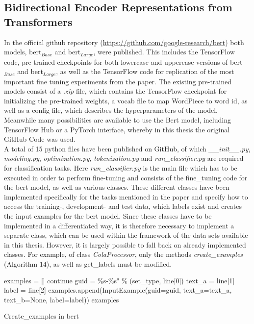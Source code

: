 \documentclass[a4paper, 11pt,titlepage,oneside,openany]{book}
\begin{document}
\subsection{Bidirectional Encoder Representations from Transformers}
In the official github repository (\url{https://github.com/google-research/bert}) both models, \gls{bert}$_{Base}$ and \gls{bert}$_{Large}$, were published. This includes the TensorFlow \cite{tensorflow} code, pre-trained checkpoints for both lowercase and uppercase versions of \gls{bert}$_{Base}$ and \gls{bert}$_{Large}$, as well as the TensorFlow code for replication of the most important fine tuning experiments from the paper. The existing pre-trained models consist of a \textit{.zip} file, which contains the TensorFlow checkpoint for initializing the pre-trained weights, a vocab file to map WordPiece to word id, as well as a config file, which describes the hyperparameters of the model. Meanwhile many possibilities are available to use the Bert model, including TensorFlow Hub or a PyTorch \cite{pytorch} interface, whereby in this thesis the original GitHub Code was used. \\ 
\noindent A total of 15 python files have been published on GitHub, of which \textit{\_\_init\_\_.py}, \textit{modeling.py}, \textit{optimization.py}, \textit{tokenization.py} and \textit{run\_classifier.py} are required for classification tasks. Here \textit{run\_classifier.py} is the main file which has to be executed in order to perform fine-tuning and consists of the fine\_tuning code for the \gls{bert} model, as well as various classes. These different classes have been implemented specifically for the tasks mentioned in the paper and specify how to access the training-, development- and test data, which labels exist and creates the input examples for the \gls{bert} model. Since these classes have to be implemented in a differentiated way, it is therefore necessary to implement a separate class, which can be used within the framework of the data sets available in this thesis. However, it is largely possible to fall back on already implemented classes. For example, of class \textit{ColaProcessor}, only the methods \textit{ create\_examples} (Algorithm 14), as well as get\_labels must be modified. 
\begin{algorithm}[t]
	\DontPrintSemicolon
	examples = []\;
	{
		{
			continue
		}
		guid = \%s-\%s" \% (set\_type, line[0])\;
		text\_a = line[1]\;
		label = line[2]\;
		examples.append(InputExample(guid=guid, text\_a=text\_a, text\_b=None, label=label))\;
	}
	\Return examples
	\caption{Create\_examples in \gls{bert}}
\end{algorithm} 
\end{document}
